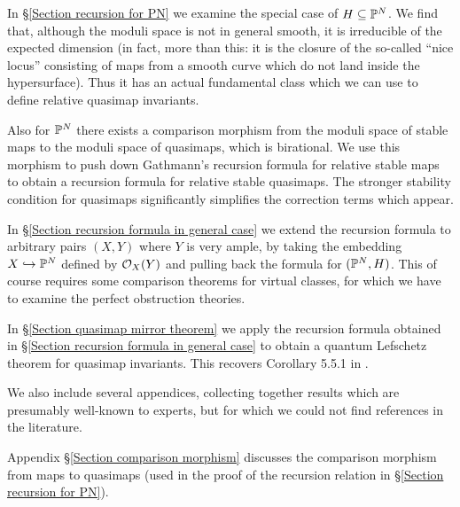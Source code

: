 In \S \ref{Section recursion for PN} we examine the special case of $H \subseteq \mathbb P^N$. We find that, although the moduli space is not in general smooth, it is irreducible of the expected dimension (in fact, more than this: it is the closure of the so-called ``nice locus'' consisting of maps from a smooth curve which do not land inside the hypersurface). Thus it has an actual fundamental class which we can use to define relative quasimap invariants.

Also for $\mathbb P^N$ there exists a comparison morphism from the moduli space of stable maps to the moduli space of quasimaps, which is birational. We use this morphism to push down Gathmann's recursion formula for relative stable maps to obtain a recursion formula for relative stable quasimaps. The stronger stability condition for quasimaps significantly simplifies the correction terms which appear.

In \S \ref{Section recursion formula in general case} we extend the recursion formula to arbitrary pairs $(X,Y)$ where $Y$ is very ample, by taking the embedding $X \hookrightarrow \mathbb P^N$ defined by $\mathcal{O}_X(Y)$ and pulling back the formula for $(\mathbb P^N,H)$. This of course requires some comparison theorems for virtual classes, for which we have to examine the perfect obstruction theories.

In \S \ref{Section quasimap mirror theorem} we apply the recursion formula obtained in \S \ref{Section recursion formula in general case} to obtain a quantum Lefschetz theorem for quasimap invariants. This recovers Corollary 5.5.1 in \cite{CF-K-wallcrossing}.

We also include several appendices, collecting together results which are presumably well-known to experts, but for which we could not find references in the literature.

Appendix \S \ref{Section comparison morphism} discusses the comparison morphism from maps to quasimaps (used in the proof of the recursion relation in \S \ref{Section recursion for PN}).

